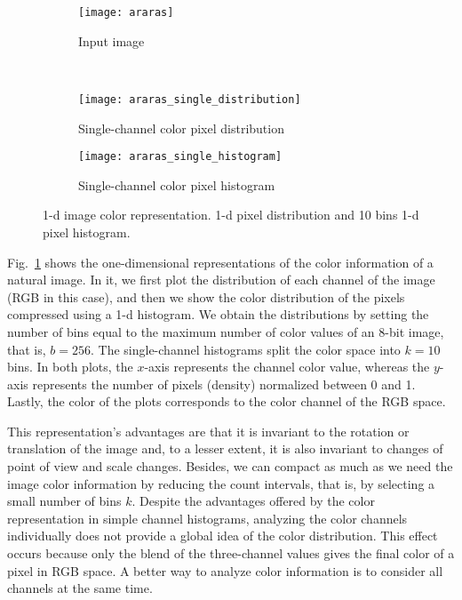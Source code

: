 \begin{figure}[!ht]

	\centering
    \begin{subfigure}[b]{0.25\textwidth}
        \texttt{[image: araras]}
        \caption{Input image}
    \end{subfigure} \\
       
    \begin{subfigure}[b]{0.49\textwidth}
        \texttt{[image: araras\_single\_distribution]}
        \caption{Single-channel color pixel distribution}
    \end{subfigure} 
    \begin{subfigure}[b]{0.49\textwidth}
        \texttt{[image: araras\_single\_histogram]}
        \caption{Single-channel color pixel histogram}
    \end{subfigure}    
    
    \caption{1-d image color representation. 1-d pixel distribution and 10 bins 1-d pixel histogram.}\label{fig:single_channel_histogram}    
\end{figure}

Fig.\ \ref{fig:single_channel_histogram} shows the one-dimensional representations of the color information of a natural image. In it, we first plot the distribution of each channel of the image (RGB in this case), and then we show the color distribution of the pixels compressed using a 1-d histogram. We obtain the distributions by setting the number of bins equal to the maximum number of color values of an 8-bit image, that is, $b = 256$. The single-channel histograms split the color space into $k=10$ bins. In both plots, the $x$-axis represents the channel color value, whereas the $y$-axis represents the number of pixels (density) normalized between 0 and 1. Lastly, the color of the plots corresponds to the color channel of the RGB space.

This representation's advantages are that it is invariant to the rotation or translation of the image and, to a lesser extent, it is also invariant to changes of point of view and scale changes. Besides, we can compact as much as we need the image color information by reducing the count intervals, that is, by selecting a small number of bins $k$. Despite the advantages offered by the color representation in simple channel histograms, analyzing the color channels individually does not provide a global idea of the color distribution. This effect occurs because only the blend of the three-channel values gives the final color of a pixel in RGB space. A better way to analyze color information is to consider all channels at the same time.

